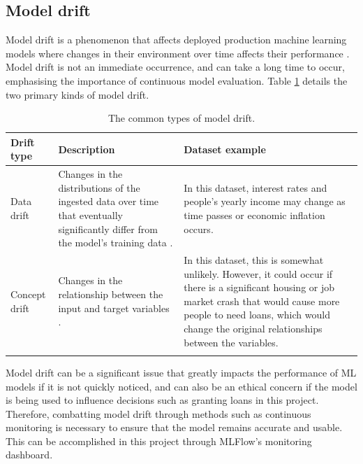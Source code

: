 \documentclass[12pt]{report}
\newcommand{\para}{\vspace{7pt}\noindent}
\begin{document}
\subsection{Model drift}
Model drift is a phenomenon that affects deployed production machine learning models where changes in 
their environment over time affects their performance \autocite{nigenda_amazon_2022}. Model drift is not an 
immediate occurrence, and can take a long time to occur, emphasising the importance of continuous model evaluation. 
Table \ref{tab:Drift} details the two primary kinds of model drift.

\begin{longtable}{ | p{} | p{} | p{} |}
    \hline
    \cellcolor{blue!25}Drift type & \cellcolor{blue!25}Description & \cellcolor{blue!25}Dataset example\\
    \hline
    Data drift & Changes in the distributions of the ingested data over time that eventually significantly differ from the model's training data \autocite{datacamp_understanding_nodate}.
    & In this dataset, interest rates and people's yearly income may change as time passes or economic inflation occurs.\\
    \hline
    Concept drift & Changes in the relationship between the input and target variables \autocite{nigenda_amazon_2022}. 
    & In this dataset, this is somewhat unlikely. However, it could occur if there is a significant housing or job market crash 
    that would cause more people to need loans, which would change the original relationships between the variables.\\
    \hline
\caption{The common types of model drift.}\label{tab:Drift}
\end{longtable}

\pagebreak %
\para Model drift can be a significant issue that greatly impacts the performance of ML models if it is not quickly noticed, and can 
also be an ethical concern if the model is being used to influence decisions such as granting loans in this project. 
Therefore, combatting model drift through methods such as continuous monitoring is necessary to ensure that the model remains accurate 
and usable. This can be accomplished in this project through MLFlow's monitoring dashboard.

\end{document}
